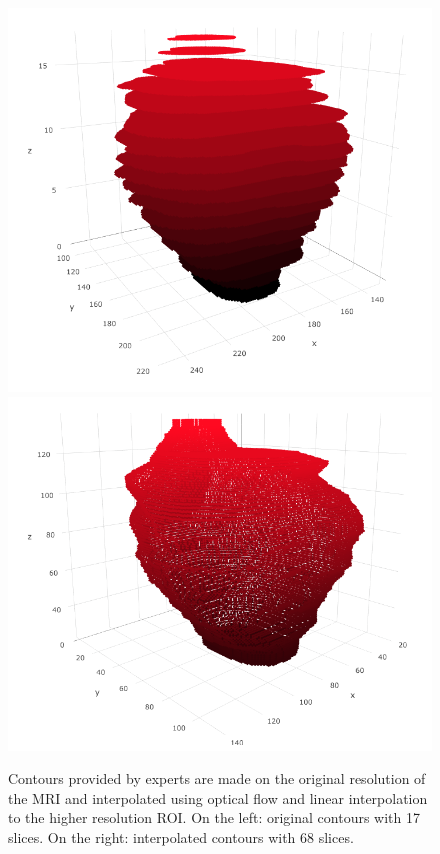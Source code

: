 \begin{figure}[h]
    \centering
    \includegraphics[totalheight=.15\textheight]{imgs/methodology/OF_1.png}
    \includegraphics[totalheight=.15\textheight]{imgs/methodology/OF_2.png}
    \caption{Contours provided by experts are made on the original resolution of the MRI and interpolated using optical flow and linear interpolation to the higher resolution ROI. On the left: original contours with 17 slices. On the right: interpolated contours with 68 slices.}
    \label{fig:of1}
\end{figure}

